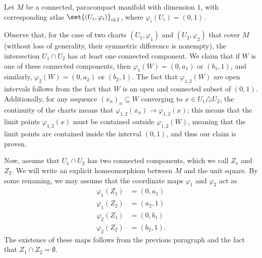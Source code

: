 \documentclass[10pt]{mypackage}
\begin{document}
\begin{solution}
  Let $M$ be a connected, paracompact manifold with dimension $1$, with corresponding atlas $\set{\left( U_i,\varphi_i \right)}_{i\in I}$, where $\varphi_i\left( U_i \right) = (0,1)$.\newline

  Observe that, for the case of two charts $\left( U_1,\varphi_{1} \right)$ and $\left( U_2,\varphi_2 \right)$ that cover $M$ (without loss of generality, their symmetric difference is nonempty), the intersection $U_1\cap U_2$ has at least one connected component. We claim that if $W$ is one of these connected components, then $\varphi_1(W) = \left(0,a_1\right)$ or $\left(b_1,1\right)$, and similarly, $\varphi_2\left( W \right) = \left(0,a_2\right)$ or $\left( b_2,1 \right)$. The fact that $\varphi_{1,2}\left( W \right)$ are open intervals follows from the fact that $W$ is an open and connected subset of $(0,1)$. Additionally, for any sequence $\left( x_n \right)_n\subseteq W$ converging to $x\in U_1\triangle U_2$, the continuity of the charts means that $\varphi_{1,2}\left( x_n \right) \rightarrow \varphi_{1,2}\left( x \right)$; this means that the limit points $\varphi_{1,2}\left( x \right)$ must be contained outside $\varphi_{1,2}\left( W \right)$, meaning that the limit points are contained inside the interval $(0,1)$, and thus our claim is proven.\newline

  Now, assume that $U_1\cap U_2$ has two connected components, which we call $Z_1$ and $Z_2$. We will write an explicit homeomorphism between $M$ and the unit square. By some renaming, we may assume that the coordinate maps $\varphi_1$ and $\varphi_2$ act as
  \begin{align*}
    \varphi_1\left( Z_1 \right) &= \left( 0,a_1 \right)\\
    \varphi_1\left( Z_2 \right) &= \left( a_2,1 \right)\\
    \varphi_2\left( Z_1 \right) &= \left( 0,b_1 \right)\\
    \varphi_2\left( Z_2 \right) &= \left( b_2,1 \right).
  \end{align*}
  The existence of these maps follows from the previous paragraph and the fact that $Z_1\cap Z_2 = \emptyset$.\newline


\end{solution}
\end{document}

